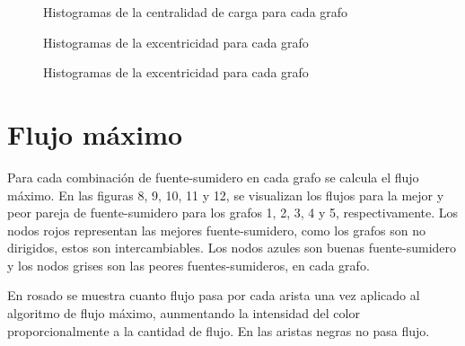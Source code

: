 \documentclass{article}
\begin{document}
\begin{figure}[htbp]
\caption{Histogramas de la centralidad de carga para cada grafo}
\label{CentCa} 
\end{figure}

\begin{figure}[htbp]
\caption{Histogramas de la excentricidad para cada grafo}
\label{Excent} 
\end{figure}

\begin{figure}[htbp]
\caption{Histogramas de la excentricidad para cada grafo}
\label{PageR} 
\end{figure}

\section*{Flujo máximo}

Para cada combinación de fuente-sumidero en cada grafo se calcula el flujo máximo. En las figuras 8, 9, 10, 11 y 12, se visualizan los flujos para la mejor y peor pareja de fuente-sumidero para los grafos 1, 2, 3, 4 y 5, respectivamente. Los nodos rojos representan las mejores fuente-sumidero, como los grafos son no dirigidos, estos son intercambiables. Los nodos azules son buenas fuente-sumidero y los nodos grises son las peores fuentes-sumideros, en cada grafo. 

En rosado se muestra cuanto flujo pasa por cada arista una vez aplicado al algoritmo de flujo máximo, aunmentando la intensidad del color proporcionalmente a la cantidad de flujo. En las aristas negras no pasa flujo.
\end{document}
